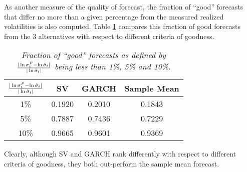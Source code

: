 As another measure of the quality of forecast, the fraction of
``good'' forecasts that differ no more than a given percentage from
the measured realized volatilities is also computed. Table
\ref{tab:nordea_good_percentage} compares this fraction of good
forecasts from the 3 alternatives with respect to different
criteria of goodness.
\begin{table}[htb!]
  \centering
  \begin{tabular}{|c|c|c|c|}
    \hline
    ${|\ln \sigma^F_t - \ln \hat{\sigma}_t| \over |\ln
      \hat{\sigma}_t|}$ &
    SV & GARCH & Sample Mean \\
    \hline
    1\% & 0.1920 & 0.2010 & 0.1843 \\
    \hline
    5\% & 0.7887 & 0.7436 & 0.7229 \\
    \hline
    10\% & 0.9665 & 0.9601 & 0.9369 \\
    \hline
  \end{tabular}
  \caption{\small \it Fraction of ``good'' forecasts as defined by
    ${|\ln \sigma^F_t - \ln \hat{\sigma}_t| \over |\ln
      \hat{\sigma}_t|}$ being less than 1\%, 5\% and 10\%.}
  \label{tab:nordea_good_percentage}
\end{table}
Clearly, although SV and GARCH rank differently with respect to
different criteria of goodness, they both out-perform the sample
mean forecast.

